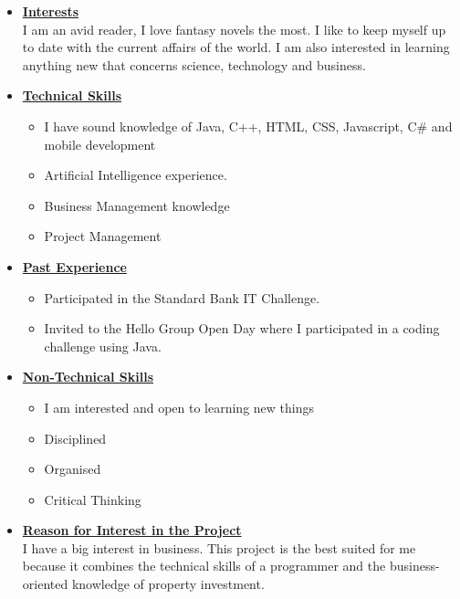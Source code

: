 \documentclass[a4paper,12pt]{article}
\begin{document}
\begin{itemize}
\item {\Large \underline{\textbf{Interests}}}\\[0.2cm]
I am an avid reader, I love fantasy novels the most. I like to keep myself up to date with the current affairs of the world. I am also interested in learning anything new that concerns science, technology and business.
\\
\item {\Large \underline{\textbf{Technical Skills}}}
	\begin{itemize}
		\item I have sound knowledge of Java, C++, HTML, CSS, Javascript, C\# and mobile development 
		\item Artificial Intelligence experience.
		\item Business Management knowledge
		\item Project Management
	\end{itemize}
\bigskip
\item {\Large \underline{\textbf{Past Experience}}}
\begin{itemize}
\item Participated in the Standard Bank IT Challenge.
\item Invited to the Hello Group Open Day where I participated in a coding challenge using Java.
\end{itemize}
\bigskip
\item {\Large \underline{\textbf{Non-Technical Skills}}}
\begin{itemize}
\item I am interested and open to learning new things
\item Disciplined
\item Organised
\item Critical Thinking
\end{itemize}
\bigskip
\item {\Large \underline{\textbf{Reason for Interest in the Project}}}\\[0.2cm]
I have a big interest in business. This project is the best suited for me because it combines the technical skills of a programmer and the business-oriented knowledge of property investment.

\newpage
\end{itemize}
\end{document}
